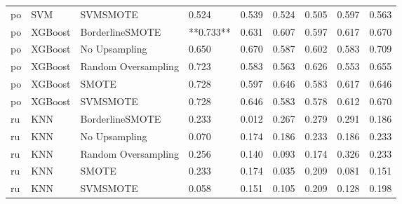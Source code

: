 \begin{tabular}{lllllllll}
      po &                          SVM &            SVMSMOTE &     0.524 &                     0.539 &                 0.524 &                  0.505 &                                   0.597 &     0.563 \\
      po &                      XGBoost &     BorderlineSMOTE & **0.733** &                     0.631 &                 0.607 &                  0.597 &                                   0.617 &     0.670 \\
      po &                      XGBoost &       No Upsampling &     0.650 &                     0.670 &                 0.587 &                  0.602 &                                   0.583 &     0.709 \\
      po &                      XGBoost & Random Oversampling &     0.723 &                     0.583 &                 0.563 &                  0.626 &                                   0.553 &     0.655 \\
      po &                      XGBoost &               SMOTE &     0.728 &                     0.597 &                 0.646 &                  0.583 &                                   0.617 &     0.646 \\
      po &                      XGBoost &            SVMSMOTE &     0.728 &                     0.646 &                 0.583 &                  0.578 &                                   0.612 &     0.670 \\
      ru &                          KNN &     BorderlineSMOTE &     0.233 &                     0.012 &                 0.267 &                  0.279 &                                   0.291 &     0.186 \\
      ru &                          KNN &       No Upsampling &     0.070 &                     0.174 &                 0.186 &                  0.233 &                                   0.186 &     0.233 \\
      ru &                          KNN & Random Oversampling &     0.256 &                     0.140 &                 0.093 &                  0.174 &                                   0.326 &     0.233 \\
      ru &                          KNN &               SMOTE &     0.233 &                     0.174 &                 0.035 &                  0.209 &                                   0.081 &     0.151 \\
      ru &                          KNN &            SVMSMOTE &     0.058 &                     0.151 &                 0.105 &                  0.209 &                                   0.128 &     0.198 \\

\end{tabular}
